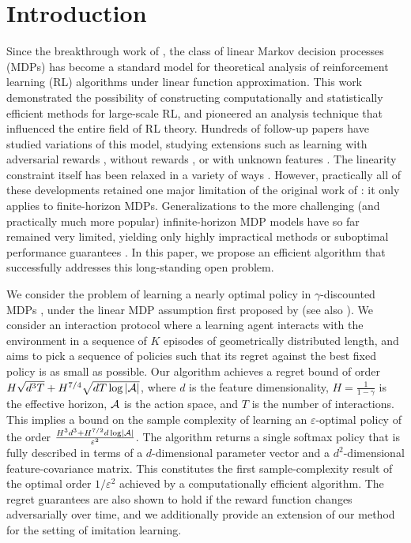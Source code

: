 \section{Introduction}

Since the breakthrough work of \citet{jin2019provably}, the class of linear Markov decision processes (MDPs) has become a standard model for theoretical analysis of reinforcement learning (RL) algorithms under linear function approximation. This work demonstrated the possibility of constructing computationally and statistically efficient methods for large-scale RL, and pioneered an analysis technique that influenced the entire field of RL theory. Hundreds of follow-up papers have studied variations of this model, studying extensions such as learning with adversarial rewards \citep{Neu:2021,zhong2024theoretical,sherman2023,dai2023, sherman2023rate,cassel2024warmupfree,liu2023towards}, without rewards \citep{Wang:2020b,wagenmaker2022reward,hu2022towards}, or with unknown features \cite{agarwal2020flambe,uehara2021representation,zhang2022efficient,mhammedi2024efficient,modi2024model}. The linearity constraint itself has been relaxed in a variety of ways \cite{zanette2020learning,Cai:2020,du2021bilinear,weisz2024online,golowich2024linear,wu2024computationally}. However, practically all of these developments retained one major limitation of the original work of \citet{jin2019provably}: it only applies to finite-horizon MDPs. Generalizations to the more challenging (and practically much more popular) infinite-horizon MDP models have so far remained very limited, yielding only highly impractical methods or suboptimal performance guarantees \citep{WJLJ20}. In this paper, we propose an efficient algorithm that successfully addresses this long-standing open problem.

We consider the problem of learning a nearly optimal policy in $\gamma$-discounted MDPs \citep{Puterman:1994}, under the linear MDP assumption first proposed by \citet{jin2019provably} (see also \citealp{Yang:2019}). We consider an interaction protocol where a learning agent interacts with the environment in a sequence of $K$ episodes of geometrically distributed length, and aims to pick a sequence of policies such that its regret against the best fixed policy is as small as possible. Our algorithm achieves a regret bound of order $H\sqrt{d^3T} + H^{7/4} \sqrt{d T \log |\mathcal{A}|}$, where $d$ is the feature dimensionality, $H = \frac{1}{1-\gamma}$ is the effective horizon, $\mathcal{A}$ is the action space, and $T$ is the number of interactions. This implies a bound on the sample complexity of learning an $\varepsilon$-optimal policy of the order $\frac{H^3 d^3 + H^{7/2} d \log \left|\mathcal{A}\right|}{\varepsilon^2}$. The algorithm returns a single softmax policy that is fully described in terms of a $d$-dimensional parameter vector and a $d^2$-dimensional feature-covariance matrix. This constitutes the first sample-complexity result of the optimal order $1/\varepsilon^2$ achieved by a computationally efficient algorithm. The regret guarantees are also shown to hold if the reward function changes adversarially over time, and we additionally provide an extension of our method for the setting of imitation learning.

